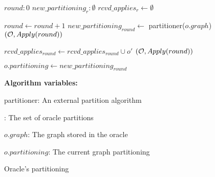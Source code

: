 \begin{algorithm}[htb]
    \small

    \begin{distribalgo}[1]

        \vspace{1.5mm}

            \STATE $round: 0$
            \STATE $new\_partitioning_{r}: \emptyset$
            \STATE $rcvd\_applies_{r} \leftarrow \emptyset$

        \ENDINDENT
        \vspace{1.5mm}
            \vspace{1.5mm}
                \STATE $round \leftarrow round + 1$
                \STATE $new\_partitioning_{round} \leftarrow$ partitioner($o.graph$)
                \STATE \rmcast$(\mathcal{O}, Apply(round))$
            \ENDINDENT

            \vspace{1.5mm}

                \STATE $rcvd\_applies_{round} \leftarrow rcvd\_applies_{round} \cup o'$
                    \STATE \amcast$(\mathcal{O}, Apply(round))$
                \ENDIF
            \ENDINDENT

            \vspace{1.5mm}
            
                \STATE $o.partitioning \leftarrow new\_partitioning_{round}$
            \ENDINDENT

        \ENDINDENT

    \vspace{1.7mm}

    \textbf{Algorithm variables:}

    \vspace{1.25mm}

    partitioner: An external partition algorithm

    \vspace{1.25mm}

    \oo: The set of oracle partitions

    \vspace{1mm}

    $o.graph$: The graph stored in the oracle

    \vspace{1mm}

    $o.partitioning$: The current graph partitioning

    \caption{Oracle's partitioning}
    \label{alg:oracle_partition}
\end{distribalgo}
\end{algorithm}
